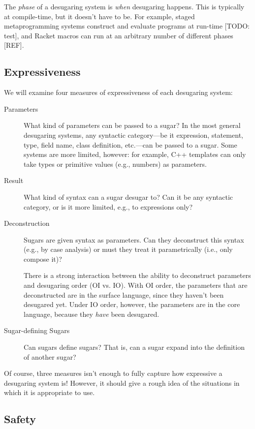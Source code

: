 The \emph{phase} of a desugaring system is \emph{when} desugaring
happens. This is typically at compile-time, but it doesn't have to be.
For example, staged metaprogramming systems construct and evaluate
programs at run-time [TODO: test], and Racket macros can run at an
arbitrary number of different phases [REF].

\subsection{Expressiveness}

We will examine four measures of expressiveness of each desugaring
system:
\begin{description}
\item[Parameters] What kind of parameters can be passed to a sugar? In
  the most general desugaring systems, any syntactic category---be it
  expression, statement, type, field name, class definition,
  etc.---can be passed to a sugar. Some systems are more limited,
  however: for example, C++ templates can only take types or primitive
  values (e.g., numbers) as parameters.
\item[Result] What kind of syntax can a sugar desugar to? Can it be
  any syntactic category, or is it more limited, e.g., to expressions
  only?
\item[Deconstruction] Sugars are given syntax as parameters. Can they
  deconstruct this syntax (e.g., by case analysis) or must
  they treat it parametrically (i.e., only compose it)?

  There is a strong interaction between the ability to deconstruct
  parameters and desugaring order (OI vs. IO). With OI order, the
  parameters that are deconstructed are in the surface language, since
  they haven't been desugared yet. Under IO order, however, the
  parameters are in the core language, because they \emph{have} been
  desugared.
\item[Sugar-defining Sugars] Can sugars define sugars? That is, can a
  sugar expand into the definition of another sugar?
\end{description}
Of course, three measures isn't enough to fully capture how expressive
a desugaring system is! However, it should give a rough idea of the
situations in which it is appropriate to use.


\subsection{Safety}\label{sec:taxonomy-safety}

